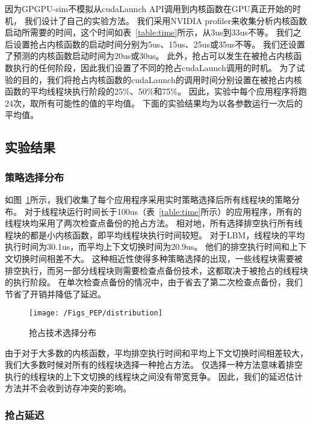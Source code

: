 因为GPGPU-sim不模拟从cudaLaunch API调用到内核函数在GPU真正开始的时机，
我们设计了自己的实验方法。
我们采用NVIDIA profiler来收集分析内核函数启动所需要的时间，这个时间如表~\ref{table:time}所示，从3us到33us不等。
我们之后设置抢占内核函数的启动时间分别为5us、15us、25us或35us不等。
我们还设置了预测的内核函数启动时间为20us或30us。
此外，抢占可以发生在被抢占内核函数执行的任何阶段，因此我们设置了不同的抢占cudaLaunch调用的时机。
为了试验的目的，我们将抢占内核函数的cudaLaunch的调用时间分别设置在被抢占内核函数的平均线程块执行阶段的25\%、50\%和75\%。
因此，实验中每个应用程序将跑24次，取所有可能性的值的平均值。
下面的实验结果均为以各参数运行一次后的平均值。


\subsection{实验结果}

\subsubsection{策略选择分布}
如图~\ref{fig:distribution}所示，我们收集了每个应用程序采用实时策略选择后所有线程块的策略分布。
对于线程块运行时间长于100us（表~\ref{table:time}所示）的应用程序，所有的线程块均采用了两次检查点备份的抢占方法。
相对地，所有选择排空执行所有线程块的都是小内核函数，即平均线程块执行时间较短。
对于LBM，线程块的平均执行时间为30.1us，而平均上下文切换时间为20.9us。
他们的排空执行时间和上下文切换时间相差不大。
这种相近性使得多种策略选择的出现，一些线程块需要被排空执行，而另一部分线程块则需要检查点备份技术，这都取决于被抢占的线程块的执行阶段。
在单次检查点备份的情况中，由于省去了第二次检查点备份，我们节省了开销并降低了延迟。

\begin{figure}[htbp] %
  \centering
  \texttt{[image: /Figs\_PEP/distribution]}
  \caption{抢占技术选择分布}
  \label{fig:distribution}
\end{figure}



由于对于大多数的内核函数，平均排空执行时间和平均上下文切换时间相差较大，我们大多数时候对所有的线程块选择一种抢占方法。
仅选择一种方法意味着排空执行的线程块的上下文切换的线程块之间没有带宽竞争。
因此，我们的延迟估计方法并不会收到访存冲突的影响。

\subsubsection{抢占延迟}

